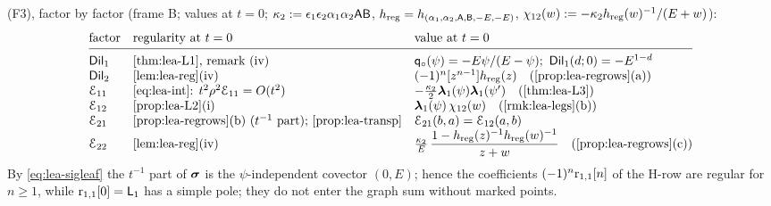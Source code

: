 (F3), factor by factor (frame B; values at $t = 0$; $\kappa_2 := \epsilon_1\epsilon_2\alpha_1\alpha_2\mathsf{A}\mathsf{B}$, $h_{\mathrm{reg}} = h_{(\alpha_1,\alpha_2,\mathsf{A},\mathsf{B},-E,-E)}$, $\chi_{12}(w) := -\kappa_2h_{\mathrm{reg}}(w)^{-1}/(E+w)$):
\begingroup\small
\begin{equation}
\label{eq:lea-table}
\begin{array}{@{}lll@{}}
\text{factor} & \text{regularity at }t = 0 & \text{value at }t = 0\\[2pt]\hline\\[-8pt]
\Dil_1 & \text{\cref{thm:lea-L1}, remark (iv)} & \qo(\psi) = -E\psi/(E-\psi);\ \Dil_1(d;0) = -E^{1-d}\\
\Dil_2 & \text{\cref{lem:lea-reg}(iv)} & (-1)^n\coef{z^{n-1}}\hreg(z)\quad(\text{\cref{prop:lea-regrows}(a)})\\
\Edge_{11} & \text{\eqref{eq:lea-int}: }t^2\rho^2\Edge_{11} = O(t^2) & -\tfrac{\kappa_2}{2}\lf_1(\psi)\lf_1(\psi')\quad(\text{\cref{thm:lea-L3}})\\
\Edge_{12} & \text{\cref{prop:lea-L2}(i)} & \lf_1(\psi)\,\chi_{12}(w)\quad(\text{\cref{rmk:lea-legs}(b)})\\
\Edge_{21} & \text{\cref{prop:lea-regrows}(b) (}t^{-1}\text{ part); \cref{prop:lea-transp}} & \Edge_{21}(b,a) = \Edge_{12}(a,b)\\
\Edge_{22} & \text{\cref{lem:lea-reg}(iv)} & \tfrac{\kappa_2}{E}\,\dfrac{1-\hreg(z)^{-1}\hreg(w)^{-1}}{z+w}\quad(\text{\cref{prop:lea-regrows}(c)})
\end{array}
\end{equation}
\endgroup
By \eqref{eq:lea-sigleaf} the $t^{-1}$ part of $\boldsymbol{\sigma}$ is the $\psi$-independent covector $(0,E)$; hence the coefficients $(-1)^n\mathrm{r}_{1,1}[n]$ of the H-row are regular for $n\geq 1$, while $\mathrm{r}_{1,1}[0] = \mathsf{L}_1$ has a simple pole; they do not enter the graph sum without marked points.

